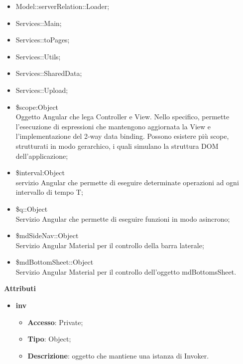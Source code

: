 {{\begin{itemize}
\begin{itemize}
				\item ConcretePortaAvantiCommand;
				\item ConcretePortaDietroCommand;
				\item ConcreteAddToMainPathCommand;
				\item ConcreteRemoveFromMainPathCommand
			\end{itemize}
			\item Model::\-serverRelation::\-Loader;
			\item Services::\-Main;
			\item Services::\-toPages;
			\item Services::\-Utils;
			\item Services::\-SharedData;
			\item Services::\-Upload;
			\item \$scope:Object\\
				\indent Oggetto Angular che lega Controller e View. Nello specifico, permette l'esecuzione di espressioni che mantengono aggiornata la View e l'implementazione del 2-way data binding. Possono esistere più scope, strutturati in modo gerarchico, i quali simulano la struttura DOM dell'applicazione;
			\item \$interval:Object\\
				\indent servizio Angular che permette di eseguire determinate operazioni ad ogni intervallo di tempo T;
			\item \$q::\-Object\\
				\indent Servizio Angular che permette di eseguire funzioni in modo asincrono;
			\item \$mdSideNav::\-Object\\
				\indent Servizio Angular Material per il controllo della barra laterale;
			\item \$mdBottomSheet::\-Object\\
				\indent Servizio Angular Material per il controllo dell'oggetto mdBottomsSheet.
		\end{itemize}
		\textbf{Attributi}\\
		\begin{itemize}
			\item \textbf{inv}
			\begin{itemize}
				\item \textbf{Accesso}: Private;
				\item \textbf{Tipo}: Object;
				\item \textbf{Descrizione}: oggetto che mantiene una istanza di Invoker.
			\end{itemize}

\end{itemize}}}
